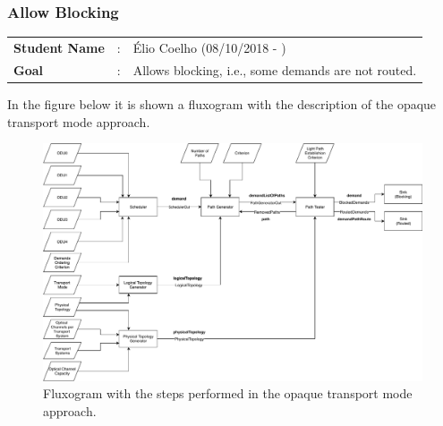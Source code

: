 \subsubsection{Allow Blocking}

\begin{tcolorbox}	
	\begin{tabular}{p{2.75cm} p{0.2cm} p{10.5cm}} 	
		\textbf{Student Name}   &:& \'Elio Coelho    (08/10/2018 - )\\
		\textbf{Goal}           &:& Allows blocking, i.e., some demands are not routed.
	\end{tabular}
\end{tcolorbox}

\vspace{13pt}

In the figure below it is shown a fluxogram with the description of the opaque transport mode approach.

\begin{figure}[H]
	\centering
	\includegraphics[width=16cm]{sdf/heuristic/opaque/figures/fluxogram_opaque}
	\caption{Fluxogram with the steps performed in the opaque transport mode approach.}
	\label{fluxogram_opaque}
\end{figure}

